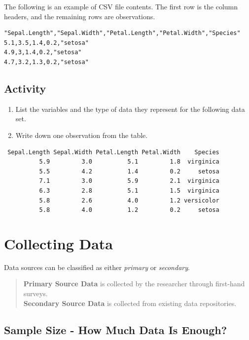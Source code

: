 \documentclass[
]{book}
\providecommand{\tightlist}{%
  \setlength{\itemsep}{0pt}\setlength{\parskip}{0pt}}
\begin{document}
The following is an example of CSV file contents. The first row is the column headers, and the remaining rows are observations.

\begin{verbatim}
"Sepal.Length","Sepal.Width","Petal.Length","Petal.Width","Species"
5.1,3.5,1.4,0.2,"setosa"
4.9,3,1.4,0.2,"setosa"
4.7,3.2,1.3,0.2,"setosa"
\end{verbatim}

\subsection{Activity}\label{activity-1}

\begin{enumerate}
\def\labelenumi{\arabic{enumi}.}
\tightlist
\item
  List the variables and the type of data they represent for the following data set.
\item
  Write down one observation from the table.
\end{enumerate}

\begin{verbatim}
 Sepal.Length Sepal.Width Petal.Length Petal.Width    Species
          5.9         3.0          5.1         1.8  virginica
          5.5         4.2          1.4         0.2     setosa
          7.1         3.0          5.9         2.1  virginica
          6.3         2.8          5.1         1.5  virginica
          5.8         2.6          4.0         1.2 versicolor
          5.8         4.0          1.2         0.2     setosa
\end{verbatim}

\section{Collecting Data}\label{collecting-data}

Data sources can be classified as either \emph{primary} or \emph{secondary}.

\begin{quote}
\textbf{Primary Source Data} is collected by the researcher through first-hand surveys.\\
\textbf{Secondary Source Data} is collected from existing data repositories.
\end{quote}

\subsection{Sample Size - How Much Data Is Enough?}\label{sample-size---how-much-data-is-enough}
\end{document}
